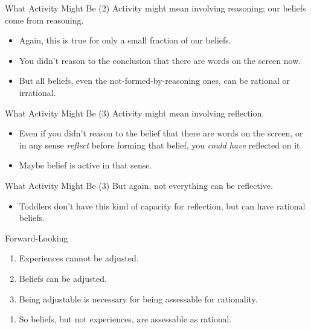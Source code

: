 \documentclass[
  17pt,
  letterpaper,
  ignorenonframetext,
  aspectratio=169,
  xcolor={dvipsnames}]{beamer}
\providecommand{\tightlist}{%
  \setlength{\itemsep}{0pt}\setlength{\parskip}{0pt}}\usepackage{longtable,booktabs,array}
\begin{document}
\begin{frame}{What Activity Might Be (2)}
\protect\hypertarget{what-activity-might-be-2}{}
Activity might mean involving reasoning; our beliefs come from
reasoning.

\begin{itemize}[<+->]
\tightlist
\item
  Again, this is true for only a small fraction of our beliefs.
\item
  You didn't reason to the conclusion that there are words on the screen
  now.
\item
  But all beliefs, even the not-formed-by-reasoning ones, can be
  rational or irrational.
\end{itemize}
\end{frame}

\begin{frame}{What Activity Might Be (3)}
\protect\hypertarget{what-activity-might-be-3}{}
Activity might mean involving reflection.

\begin{itemize}[<+->]
\tightlist
\item
  Even if you didn't reason to the belief that there are words on the
  screen, or in any sense \emph{reflect} before forming that belief, you
  \emph{could have} reflected on it.
\item
  Maybe belief is active in that sense.
\end{itemize}
\end{frame}

\begin{frame}{What Activity Might Be (3)}
\protect\hypertarget{what-activity-might-be-3-1}{}
But again, not everything can be reflective.

\begin{itemize}[<+->]
\tightlist
\item
  Toddlers don't have this kind of capacity for reflection, but can have
  rational beliefs.
\end{itemize}
\end{frame}

\begin{frame}{Forward-Looking}
\protect\hypertarget{forward-looking}{}
\begin{enumerate}[<+->]
\tightlist
\item
  Experiences cannot be adjusted.
\item
  Beliefs can be adjusted.
\item
  Being adjustable is necessary for being assessable for rationality.
\end{enumerate}

\begin{enumerate}[<+->]
[A.]
\setcounter{enumi}{2}
\tightlist
\item
  So beliefs, but not experiences, are assessable as rational.
\end{enumerate}
\end{frame}
\end{document}
